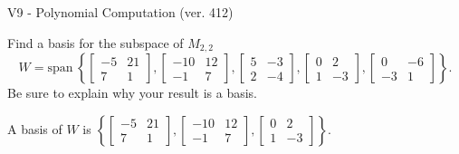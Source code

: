 \begin{exercise}
  \begin{exerciseTitle}V9 - Polynomial Computation (ver. 412)\end{exerciseTitle}
  \begin{exerciseStatement}
    Find a basis for the subspace of \(M_{2,2}\) 
\[W=\mathrm{span}\ \left\{\left[\begin{array}{cc}
-5 & 21 \\
7 & 1
\end{array}\right] , \left[\begin{array}{cc}
-10 & 12 \\
-1 & 7
\end{array}\right] , \left[\begin{array}{cc}
5 & -3 \\
2 & -4
\end{array}\right] , \left[\begin{array}{cc}
0 & 2 \\
1 & -3
\end{array}\right] , \left[\begin{array}{cc}
0 & -6 \\
-3 & 1
\end{array}\right]\right\}.\]
 Be sure to explain why your result is a basis.


  \end{exerciseStatement}
  \begin{exerciseAnswer}
   A basis of \(W\) is  \(\left\{\left[\begin{array}{cc}
-5 & 21 \\
7 & 1
\end{array}\right] , \left[\begin{array}{cc}
-10 & 12 \\
-1 & 7
\end{array}\right] , \left[\begin{array}{cc}
0 & 2 \\
1 & -3
\end{array}\right]\right\}\).
  


  \end{exerciseAnswer}
\end{exercise}
